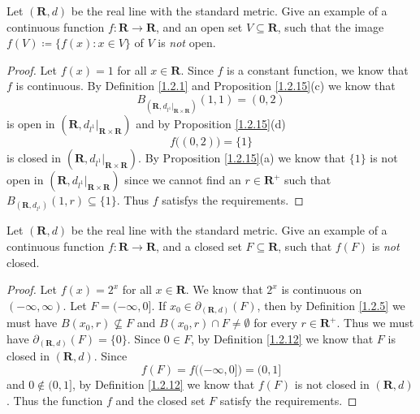 \begin{exercise}\label{ex 1.5.4}
    Let \((\mathbf{R}, d)\) be the real line with the standard metric.
    Give an example of a continuous function \(f : \mathbf{R} \to \mathbf{R}\), and an open set \(V \subseteq \mathbf{R}\), such that the image \(f(V) \coloneqq \{f(x) : x \in V\}\) of \(V\) is \emph{not} open.
\end{exercise}

\begin{proof}
    Let \(f(x) = 1\) for all \(x \in \mathbf{R}\).
    Since \(f\) is a constant function, we know that \(f\) is continuous.
    By Definition \ref{1.2.1} and Proposition \ref{1.2.15}(c) we know that
    \[
        B_{(\mathbf{R}, d_{l^1}|_{\mathbf{R} \times \mathbf{R}})}(1, 1) = (0, 2)
    \]
    is open in \((\mathbf{R}, d_{l^1}|_{\mathbf{R} \times \mathbf{R}})\) and by Proposition \ref{1.2.15}(d)
    \[
        f\big((0, 2)\big) = \{1\}
    \]
    is closed in \((\mathbf{R}, d_{l^1}|_{\mathbf{R} \times \mathbf{R}})\).
    By Proposition \ref{1.2.15}(a) we know that \(\{1\}\) is not open in \((\mathbf{R}, d_{l^1}|_{\mathbf{R} \times \mathbf{R}})\) since we cannot find an \(r \in \mathbf{R}^+\) such that \(B_{(\mathbf{R}, d_{l^1})}(1, r) \subseteq \{1\}\).
    Thus \(f\) satisfys the requirements.
\end{proof}

\begin{exercise}\label{ex 1.5.5}
    Let \((\mathbf{R}, d)\) be the real line with the standard metric.
    Give an example of a continuous function \(f : \mathbf{R} \to \mathbf{R}\), and a closed set \(F \subseteq \mathbf{R}\), such that \(f(F)\) is \emph{not} closed.
\end{exercise}

\begin{proof}
    Let \(f(x) = 2^x\) for all \(x \in \mathbf{R}\).
    We know that \(2^x\) is continuous on \((-\infty, \infty)\).
    Let \(F = (-\infty, 0]\).
    If \(x_0 \in \partial_{(\mathbf{R}, d)}(F)\), then by Definition \ref{1.2.5} we must have \(B(x_0, r) \not\subseteq F\) and \(B(x_0, r) \cap F \neq \emptyset\) for every \(r \in \mathbf{R}^+\).
    Thus we must have \(\partial_{(\mathbf{R}, d)}(F) = \{0\}\).
    Since \(0 \in F\), by Definition \ref{1.2.12} we know that \(F\) is closed in \((\mathbf{R}, d)\).
    Since
    \[
        f(F) = f\big((-\infty, 0]\big) = (0, 1]
    \]
    and \(0 \notin (0, 1]\), by Definition \ref{1.2.12} we know that \(f(F)\) is not closed in \((\mathbf{R}, d)\).
    Thus the function \(f\) and the closed set \(F\) satisfy the requirements.
\end{proof}

